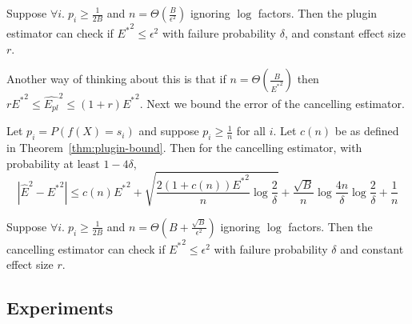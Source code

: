 \begin{theorem}
\label{thm:final-plugin}
Suppose $\forall i.\;p_i \geq \frac{1}{2B}$ and $n = \Theta(\frac{B}{\epsilon^2})$ ignoring $\log$ factors. Then the plugin estimator can check if ${E^*}^2 \leq \epsilon^2$ with failure probability $\delta$, and constant effect size $r$. 
\end{theorem}

Another way of thinking about this is that if $n = \Theta(\frac{B}{{E^*}^2})$ then $r {E^*}^2 \leq \hat{E_{pl}}^2 \leq (1+r){E^*}^2$. Next we bound the error of the cancelling estimator.



\begin{theorem}
\label{thm:our-bound}
Let $p_i = P(f(X) = s_i)$ and suppose $p_i \geq \frac{1}{n}$ for all $i$. Let $c(n)$ be as defined in Theorem~\ref{thm:plugin-bound}.
Then for the cancelling estimator, with probability at least $1 - 4\delta$,
\[ | \hat{E}^2 - {E^*}^2 | \leq c(n){E^*}^2 + \sqrt{\frac{2(1+c(n)){E^*}^2}{n} \log{\frac{2}{\delta}}} + \frac{\sqrt{B}}{n}\log{\frac{4n}{\delta}} \log{\frac{2}{\delta}} + \frac{1}{n}\]
\end{theorem}

\begin{theorem}
\label{thm:final-ours}
Suppose $\forall i.\;p_i \geq \frac{1}{2B}$ and $n = \Theta(B+\frac{\sqrt{B}}{\epsilon^2})$ ignoring $\log$ factors. Then the cancelling estimator can check if ${E^*}^2 \leq \epsilon^2$ with failure probability $\delta$ and constant effect size $r$. 
\end{theorem}

\subsection{Experiments}

